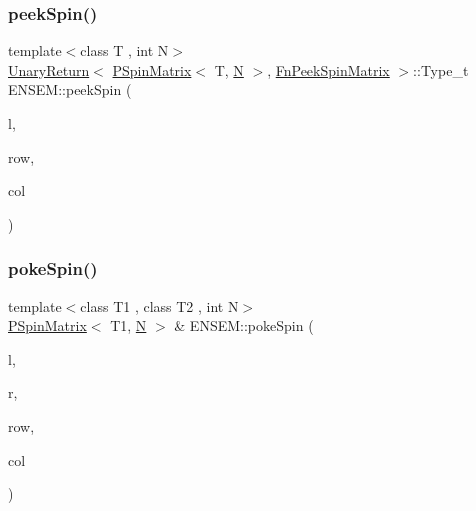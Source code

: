 \subsubsection{\texorpdfstring{peekSpin()}{peekSpin()}}
{\footnotesize\ttfamily template$<$class T , int N$>$ \\
\mbox{\hyperlink{structENSEM_1_1UnaryReturn}{Unary\+Return}}$<$ \mbox{\hyperlink{classENSEM_1_1PSpinMatrix}{P\+Spin\+Matrix}}$<$ T, \mbox{\hyperlink{adat__devel_2lib_2hadron_2operator__name__util_8cc_a7722c8ecbb62d99aee7ce68b1752f337}{N}} $>$, \mbox{\hyperlink{structENSEM_1_1FnPeekSpinMatrix}{Fn\+Peek\+Spin\+Matrix}} $>$\+::Type\+\_\+t E\+N\+S\+E\+M\+::peek\+Spin (\begin{DoxyParamCaption}\item[{const \mbox{\hyperlink{classENSEM_1_1PSpinMatrix}{P\+Spin\+Matrix}}$<$ T, \mbox{\hyperlink{adat__devel_2lib_2hadron_2operator__name__util_8cc_a7722c8ecbb62d99aee7ce68b1752f337}{N}} $>$ \&}]{l,  }\item[{int}]{row,  }\item[{int}]{col }\end{DoxyParamCaption})\hspace{0.3cm}{\ttfamily [inline]}}

\mbox{\label{group__primspinmatrix_ga79a215ef6e9982decb24addd77e93dae}} 
\subsubsection{\texorpdfstring{pokeSpin()}{pokeSpin()}}
{\footnotesize\ttfamily template$<$class T1 , class T2 , int N$>$ \\
\mbox{\hyperlink{classENSEM_1_1PSpinMatrix}{P\+Spin\+Matrix}}$<$ T1, \mbox{\hyperlink{adat__devel_2lib_2hadron_2operator__name__util_8cc_a7722c8ecbb62d99aee7ce68b1752f337}{N}} $>$ \& E\+N\+S\+E\+M\+::poke\+Spin (\begin{DoxyParamCaption}\item[{\mbox{\hyperlink{classENSEM_1_1PSpinMatrix}{P\+Spin\+Matrix}}$<$ T1, \mbox{\hyperlink{adat__devel_2lib_2hadron_2operator__name__util_8cc_a7722c8ecbb62d99aee7ce68b1752f337}{N}} $>$ \&}]{l,  }\item[{const \mbox{\hyperlink{classENSEM_1_1PScalar}{P\+Scalar}}$<$ T2 $>$ \&}]{r,  }\item[{int}]{row,  }\item[{int}]{col }\end{DoxyParamCaption})\hspace{0.3cm}{\ttfamily [inline]}}



